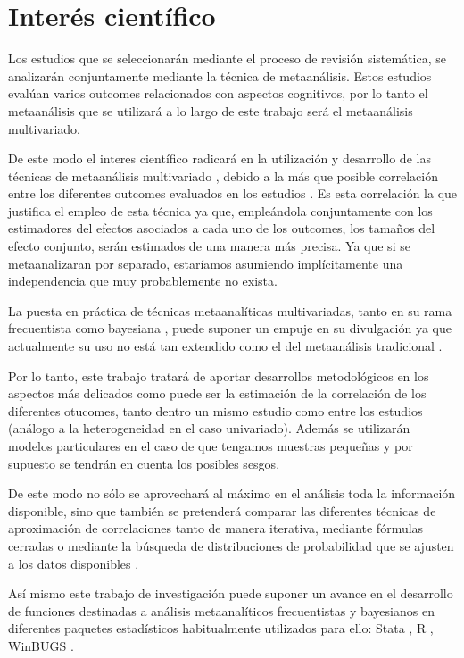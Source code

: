 \documentclass[a4paper,openright,12pt]{report}
\begin{document}
\section{Interés científico}
Los estudios que se seleccionarán mediante el proceso de revisión sistemática, se analizarán conjuntamente mediante la técnica de metaanálisis. Estos estudios evalúan varios outcomes relacionados con aspectos cognitivos, por lo tanto el metaanálisis que se utilizará a lo largo de este trabajo será el metaanálisis multivariado.

De este modo el interes científico radicará en la utilización y desarrollo de las técnicas de metaanálisis multivariado \cite{Becker2007}, debido a la más que posible correlación entre los diferentes outcomes evaluados en los estudios \cite{Berkey1996}\cite{Arends2003}. Es esta correlación la que justifica el empleo de esta técnica ya que, empleándola conjuntamente con los estimadores del efectos asociados a cada uno de los outcomes, los tamaños del efecto conjunto, serán estimados de una manera más precisa. Ya que si se metaanalizaran por separado, estaríamos asumiendo implícitamente una independencia que muy probablemente no exista.

La puesta en práctica de técnicas metaanalíticas multivariadas, tanto en su rama frecuentista como bayesiana \cite{Jackson2010} \cite{Nam2003}, puede suponer un empuje en su divulgación ya que actualmente su uso no está tan extendido como el del metaanálisis tradicional \cite{Jackson2011}.

Por lo tanto, este trabajo tratará de aportar desarrollos metodológicos en los aspectos más delicados como puede ser la estimación de la correlación de los diferentes otucomes, tanto dentro un mismo estudio como entre los estudios (análogo a la heterogeneidad en el caso univariado). Además se utilizarán modelos particulares en el caso de que tengamos muestras pequeñas y por supuesto se tendrán en cuenta los posibles sesgos.

De este modo no sólo se aprovechará al máximo en el análisis toda la información disponible, sino que también se pretenderá comparar las diferentes técnicas de aproximación de correlaciones \cite{Ishak2008}\cite{Riley2009} tanto de manera iterativa, mediante fórmulas cerradas \cite{Wei2013} o mediante la búsqueda de distribuciones de probabilidad que se ajusten a los datos disponibles \cite{Lambert2005}.

Así mismo este trabajo de investigación puede suponer un avance en el desarrollo de funciones destinadas a análisis metaanalíticos frecuentistas y bayesianos en diferentes paquetes estadísticos habitualmente utilizados para ello: Stata \cite{Stata}, R \cite{R}, WinBUGS \cite{WinBUGS}. 
\end{document}
